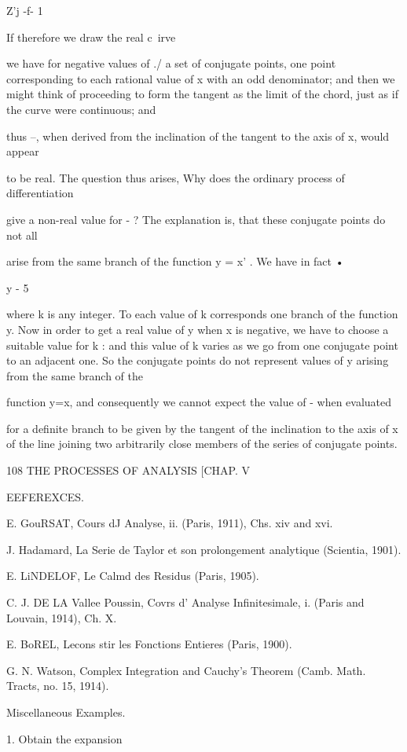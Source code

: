 {{{{Z'j -f- 1

If therefore we draw the real c\ irve

we have for negative values of ./ a set of conjugate points, one point
corresponding to each rational value of x with an odd denominator;
and then we might think of proceeding to form the tangent as the limit
of the chord, just as if the curve were continuous; and

thus --, when derived from the inclination of the tangent to the axis
of x, would appear

to be real. The question thus arises, Why does the ordinary process of
differentiation

give a non-real value for - ? The explanation is, that these conjugate
points do not all

arise from the same branch of the function y = x' . We have in fact •

y - 5

where k is any integer. To each value of k corresponds one branch of
the function y. Now in order to get a real value of y when x is
negative, we have to choose a suitable value for k : and this value of
k varies as we go from one conjugate point to an adjacent one. So the
conjugate points do not represent values of y arising from the same
branch of the

function y=x, and consequently we cannot expect the value of - when
evaluated

for a definite branch to be given by the tangent of the inclination to
the axis of x of the line joining two arbitrarily close members of the
series of conjugate points.

108 THE PROCESSES OF ANALYSIS [CHAP. V

EEFEREXCES.

E. GouRSAT, Cours dJ Analyse, ii. (Paris, 1911), Chs. xiv and xvi.

J. Hadamard, La Serie de Taylor et son prolongement analytique
(Scientia, 1901).

E. LiNDELOF, Le Calmd des Residus (Paris, 1905).

C. J. DE LA Vallee Poussin, Covrs d' Analyse Infinitesimale, i. (Paris
and Louvain, 1914), Ch. X.

E. BoREL, Lecons stir les Fonctions Entieres (Paris, 1900).

G. N. Watson, Complex Integration and Cauchy's Theorem (Camb. Math.
Tracts, no. 15, 1914).

Miscellaneous Examples.

1. Obtain the expansion

}}}}
